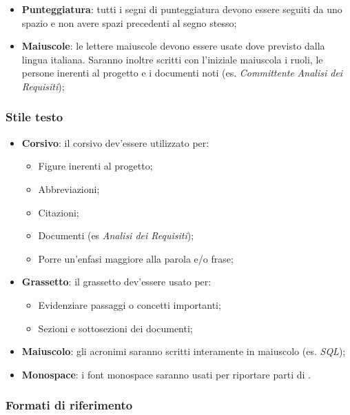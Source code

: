 \documentclass{scalatekids-article}
\begin{document}
\begin{itemize}
    \item \textbf{Punteggiatura}: tutti i segni di punteggiatura devono essere seguiti da uno spazio e non avere spazi precedenti al segno stesso;
    \item \textbf{Maiuscole}: le lettere maiuscole devono essere usate dove previsto dalla lingua italiana.
        Saranno inoltre scritti con l'iniziale maiuscola i ruoli, le persone inerenti al progetto e i documenti noti (es. \textit{Committente} \textit{Analisi dei Requisiti});
\end{itemize}

\subsubsection{Stile testo}

\begin{itemize}
    \item \textbf{Corsivo}: il corsivo dev'essere utilizzato per:
        \begin{itemize}
            \item Figure inerenti al progetto;
            \item Abbreviazioni;
            \item Citazioni;
            \item Documenti (es \textit{Analisi dei Requisiti});
            \item Porre un'enfasi maggiore alla parola e/o frase;
        \end{itemize}
    \item \textbf{Grassetto}: il grassetto dev'essere usato per:
        \begin{itemize}
            \item Evidenziare passaggi o concetti importanti;
            \item Sezioni e sottosezioni dei documenti;
        \end{itemize}
    \item \textbf{Maiuscolo}: gli acronimi saranno scritti interamente in maiuscolo (es. \textit{SQL});
    \item \textbf{Monospace}: i font monospace saranno usati per riportare parti di .
\end{itemize}

\subsubsection{Formati di riferimento}
\end{document}
